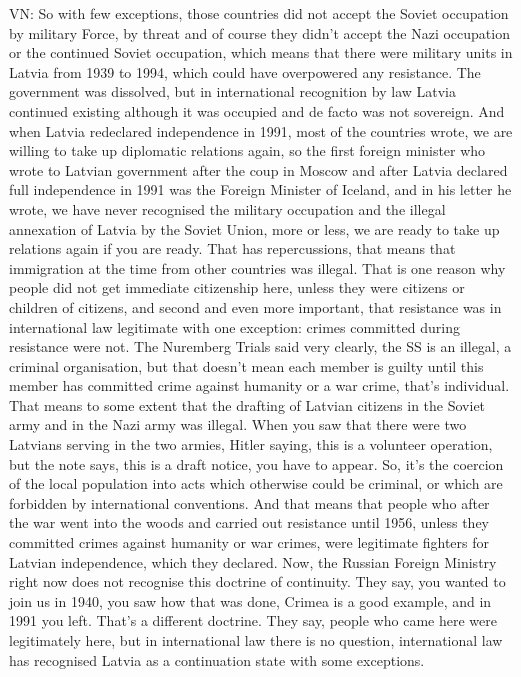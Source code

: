 VN: So with few exceptions, those countries did not accept the Soviet occupation by military Force, by threat and of course they didn't accept the Nazi occupation or the continued Soviet occupation, which means that there were military units in Latvia from 1939 to 1994, which could have overpowered any resistance. The government was dissolved, but in international recognition by law Latvia continued existing although it was occupied and de facto was not sovereign. And when Latvia redeclared independence in 1991, most of the countries wrote, we are willing to take up diplomatic relations again, so the first foreign minister who wrote to Latvian government after the coup in Moscow and after Latvia declared full independence in 1991 was the Foreign Minister of Iceland, and in his letter he wrote, we have never recognised the military occupation and the illegal annexation of Latvia by the Soviet Union, more or less, we are ready to take up relations again if you are ready. That has repercussions, that means that immigration at the time from other countries was illegal. That is one reason why people did not get immediate citizenship here, unless they were citizens or children of citizens, and second and even more important, that resistance was in international law legitimate with one exception: crimes committed during resistance were not. The Nuremberg Trials said very clearly, the SS is an illegal, a criminal organisation, but that doesn't mean each member is guilty until this member has committed crime against humanity or a war crime, that's individual. That means to some extent that the drafting of Latvian citizens in the Soviet army and in the Nazi army was illegal. When you saw that there were two Latvians serving in the two armies, Hitler saying, this is a volunteer operation, but the note says, this is a draft notice, you have to appear. So, it's the coercion of the local population into acts which otherwise could be criminal, or which are forbidden by international conventions. And that means that people who after the war went into the woods and carried out resistance until 1956, unless they committed crimes against humanity or war crimes, were legitimate fighters for Latvian independence, which they declared. Now, the Russian Foreign Ministry right now does not recognise this doctrine of continuity. They say, you wanted to join us in 1940, you saw how that was done, Crimea is a good example, and in 1991 you left. That's a different doctrine. They say, people who came here were legitimately here, but in international law there is no question, international law has recognised Latvia as a continuation state with some exceptions. 

